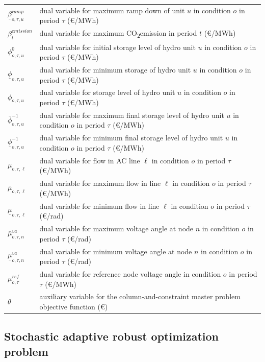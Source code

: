 \documentclass[final]{IEEEtran}
\newcommand{\COtwo}{CO\textsubscript{2}\;}
\begin{document}
\begin{supertabular}{p{1.5cm} p{6.5cm}}
	$\underline{\beta}_{o, \tau, u}^{ramp}$	& dual variable for maximum ramp down of unit $u$ in condition $o$ in period $\tau$ (€/MWh) \\
	$\beta_{t}^{emission}$ & dual variable for maximum \COtwo emission in period $t$ (€/MWh) \\
	$\phi_{o, \tau, u}^{0}$ & dual variable for initial storage level of hydro unit $u$ in condition $o$ in period $\tau$ (€/MWh) \\
	$\underline{\phi}_{o, \tau, u}$ & dual variable for minimum storage of hydro unit $u$ in condition $o$ in period $\tau$ (€/MWh) \\
	$\phi_{o, \tau, u}$ & dual variable for storage level of hydro unit $u$ in condition $o$ in period $\tau$ (€/MWh) \\
	$\bar{\phi}_{o, \tau, u}^{-1}$ & dual variable for maximum final storage level of hydro unit $u$ in condition $o$ in period $\tau$ (€/MWh) \\
	$\underline{\phi}_{o, \tau, u}^{-1}$ & dual variable for minimum final storage level of hydro unit $u$ in condition $o$ in period $\tau$ (€/MWh) \\
	$\mu_{o, \tau, \ell}$ 	& dual variable for flow in AC line $\ell$ in condition $o$ in period $\tau$ (€/MWh) \\
	$\bar{\mu}_{o, \tau, \ell}$	& dual variable for maximum flow in line $\ell$ in condition $o$ in period $\tau$ (€/MWh) \\
	$\underline{\mu}_{o, \tau, \ell}$ & dual variable for minimum flow in line $\ell$ in condition $o$ in period $\tau$ (€/rad) \\
	$\bar{\mu}^{va}_{o, \tau, n}$ & dual variable for maximum voltage angle at node $n$ in condition $o$ in period $\tau$ (€/rad) \\
	$\underline{\mu}^{va}_{o, \tau, n}$ & dual variable for minimum voltage angle at node $n$ in condition $o$ in period $\tau$ (€/rad) \\
	$\mu^{ref}_{o, \tau}$ & dual variable for reference node voltage angle in condition $o$ in period $\tau$ (€/MWh) \\
	$\theta$ 	& auxiliary variable for the column-and-constraint master problem objective function (€)
\end{supertabular}

\subsection{Stochastic adaptive robust optimization problem}
\end{document}
